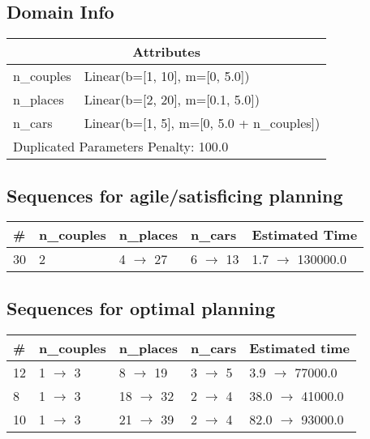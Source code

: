 \documentclass{article}
\begin{document}
                    \subsection*{Domain Info}

                    \begin{center}
                    \begin{tabular}{@{}p{}p{}@{}}
                    \multicolumn{2}{c}{\bf \large Attributes}\\\midrule
                    n\_couples & Linear(b=[1, 10], m=[0, 5.0])\\
n\_places & Linear(b=[2, 20], m=[0.1, 5.0])\\
n\_cars & Linear(b=[1, 5], m=[0, 5.0 + n\_couples])
                    
                     \\\midrule
                    \multicolumn{2}{l}{Duplicated Parameters Penalty: 100.0}
                    \end{tabular}
                    \end{center}
                
                         \subsection*{Sequences for agile/satisficing planning}

                        \begin{center}
                        \begin{tabular}{@{}l|l|l|l|l@{}}
                        \# & n\_couples & n\_places & n\_cars & Estimated Time\\\midrule
                        30&2&4 $\rightarrow$ 27&6 $\rightarrow$ 13&1.7 $\rightarrow$ 130000.0
                        \end{tabular}
                        \end{center}
                    
                            \subsection*{Sequences for optimal planning}

                            \begin{center}
                            \begin{tabular}{@{}l|l|l|l|l@{}}
                            \# & n\_couples & n\_places & n\_cars & Estimated time\\\midrule
                            12&1 $\rightarrow$ 3&8 $\rightarrow$ 19&3 $\rightarrow$ 5&3.9 $\rightarrow$ 77000.0\\
8&1 $\rightarrow$ 3&18 $\rightarrow$ 32&2 $\rightarrow$ 4&38.0 $\rightarrow$ 41000.0\\
10&1 $\rightarrow$ 3&21 $\rightarrow$ 39&2 $\rightarrow$ 4&82.0 $\rightarrow$ 93000.0
                            \end{tabular}
                            \end{center}
                    
\end{document}
